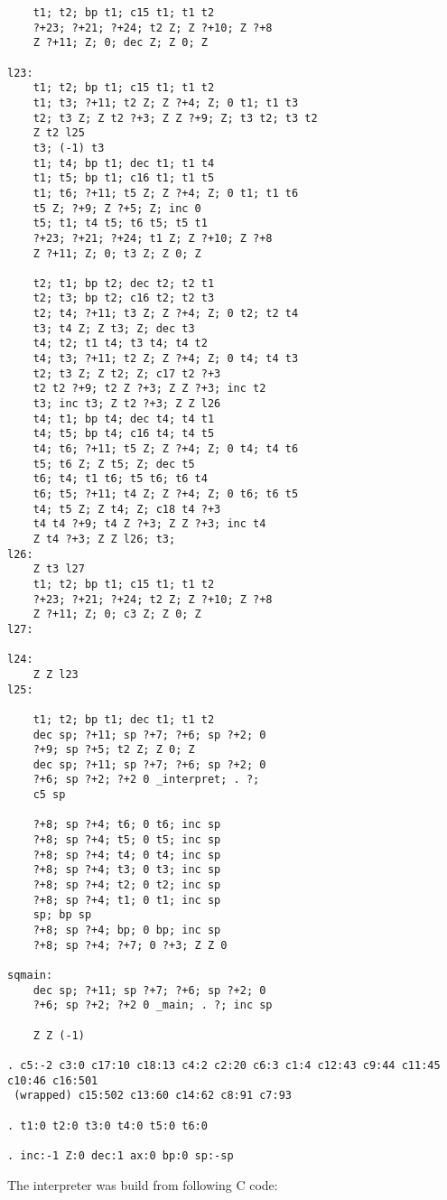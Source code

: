\documentclass{article}
\begin{document}
\begin{verbatim}
	t1; t2; bp t1; c15 t1; t1 t2
	?+23; ?+21; ?+24; t2 Z; Z ?+10; Z ?+8
	Z ?+11; Z; 0; dec Z; Z 0; Z

l23:
	t1; t2; bp t1; c15 t1; t1 t2
	t1; t3; ?+11; t2 Z; Z ?+4; Z; 0 t1; t1 t3
	t2; t3 Z; Z t2 ?+3; Z Z ?+9; Z; t3 t2; t3 t2
	Z t2 l25
	t3; (-1) t3
	t1; t4; bp t1; dec t1; t1 t4
	t1; t5; bp t1; c16 t1; t1 t5
	t1; t6; ?+11; t5 Z; Z ?+4; Z; 0 t1; t1 t6
	t5 Z; ?+9; Z ?+5; Z; inc 0
	t5; t1; t4 t5; t6 t5; t5 t1
	?+23; ?+21; ?+24; t1 Z; Z ?+10; Z ?+8
	Z ?+11; Z; 0; t3 Z; Z 0; Z

	t2; t1; bp t2; dec t2; t2 t1
	t2; t3; bp t2; c16 t2; t2 t3
	t2; t4; ?+11; t3 Z; Z ?+4; Z; 0 t2; t2 t4
	t3; t4 Z; Z t3; Z; dec t3
	t4; t2; t1 t4; t3 t4; t4 t2
	t4; t3; ?+11; t2 Z; Z ?+4; Z; 0 t4; t4 t3
	t2; t3 Z; Z t2; Z; c17 t2 ?+3
	t2 t2 ?+9; t2 Z ?+3; Z Z ?+3; inc t2
	t3; inc t3; Z t2 ?+3; Z Z l26
	t4; t1; bp t4; dec t4; t4 t1
	t4; t5; bp t4; c16 t4; t4 t5
	t4; t6; ?+11; t5 Z; Z ?+4; Z; 0 t4; t4 t6
	t5; t6 Z; Z t5; Z; dec t5
	t6; t4; t1 t6; t5 t6; t6 t4
	t6; t5; ?+11; t4 Z; Z ?+4; Z; 0 t6; t6 t5
	t4; t5 Z; Z t4; Z; c18 t4 ?+3
	t4 t4 ?+9; t4 Z ?+3; Z Z ?+3; inc t4
	Z t4 ?+3; Z Z l26; t3;
l26:
	Z t3 l27
	t1; t2; bp t1; c15 t1; t1 t2
	?+23; ?+21; ?+24; t2 Z; Z ?+10; Z ?+8
	Z ?+11; Z; 0; c3 Z; Z 0; Z
l27:

l24:
	Z Z l23
l25:

	t1; t2; bp t1; dec t1; t1 t2
	dec sp; ?+11; sp ?+7; ?+6; sp ?+2; 0
	?+9; sp ?+5; t2 Z; Z 0; Z
	dec sp; ?+11; sp ?+7; ?+6; sp ?+2; 0
	?+6; sp ?+2; ?+2 0 _interpret; . ?;
	c5 sp

	?+8; sp ?+4; t6; 0 t6; inc sp
	?+8; sp ?+4; t5; 0 t5; inc sp
	?+8; sp ?+4; t4; 0 t4; inc sp
	?+8; sp ?+4; t3; 0 t3; inc sp
	?+8; sp ?+4; t2; 0 t2; inc sp
	?+8; sp ?+4; t1; 0 t1; inc sp
	sp; bp sp
	?+8; sp ?+4; bp; 0 bp; inc sp
	?+8; sp ?+4; ?+7; 0 ?+3; Z Z 0

sqmain:
	dec sp; ?+11; sp ?+7; ?+6; sp ?+2; 0
	?+6; sp ?+2; ?+2 0 _main; . ?; inc sp

	Z Z (-1)

. c5:-2 c3:0 c17:10 c18:13 c4:2 c2:20 c6:3 c1:4 c12:43 c9:44 c11:45 c10:46 c16:501
 (wrapped) c15:502 c13:60 c14:62 c8:91 c7:93

. t1:0 t2:0 t3:0 t4:0 t5:0 t6:0

. inc:-1 Z:0 dec:1 ax:0 bp:0 sp:-sp

\end{verbatim}

\par The interpreter was build from following C code:
\end{document}
